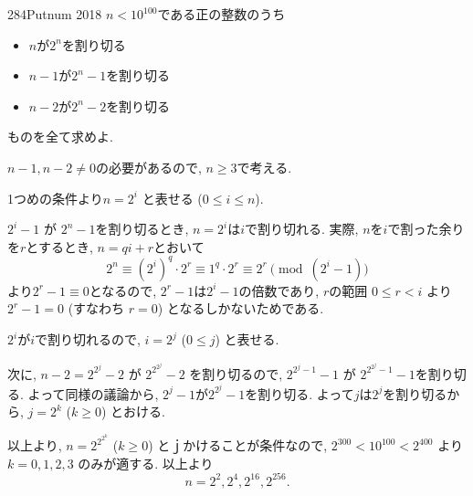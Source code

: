 \begin{prob}{284}{}{Putnum 2018}
    $n<10^{100}$である正の整数のうち
    \begin{itemize}
\item $n$が$2^n$を割り切る
\item $n-1$が$2^{n}-1$を割り切る
\item $n-2$が$2^{n}-2$を割り切る
    \end{itemize}
    ものを全て求めよ. 
\end{prob}

$n-1,n-2\neq 0$の必要があるので, $n\geq 3$で考える. 

1つめの条件より$n=2^i$ と表せる ($0\leq i\leq n$). 

$2^i - 1$ が $2^n-1$を割り切るとき, $n = 2^i$は$i$で割り切れる. 実際, $n$を$i$で割った余りを$r$とするとき, $n=qi + r$とおいて
$$
2^n \equiv (2^i)^q\cdot 2^r \equiv 1^q \cdot 2^r \equiv 2^r\pmod{(2^i - 1)} 
$$
より$2^r-1 \equiv 0$となるので, $2^r-1$は$2^i-1$の倍数であり, $r$の範囲 $0\leq r < i$ より $2^r-1 = 0$ (すなわち $r=0$) となるしかないためである. 

$2^i$が$i$で割り切れるので, $i = 2^j$ ($0\leq j$) と表せる. 

次に, $n - 2 = 2^{2^{j}} - 2$ が $2^{2^{2^{j}}} - 2$ を割り切るので, $2^{2^{j} - 1} - 1$ が $2^{2^{2^{j}} - 1} - 1$を割り切る. よって同様の議論から, $2^{j} - 1$が$2^{2^{j}} - 1$を割り切る. よって$j$は$2^{j}$を割り切るから, $j=2^k$ ($k\geq 0$) とおける. 

以上より, $n=2^{2^{2^{k}}}$ ($k\geq 0$) とｊかけることが条件なので, $2^{300}<10^{100}<2^{400}$ より $k=0,1,2,3$ のみが適する. 以上より
$$
n = 2^2, 2^4, 2^{16}, 2^{256}. 
$$